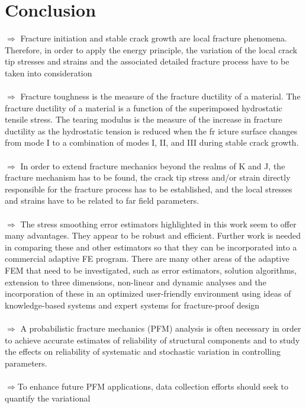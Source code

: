\documentclass[12pt]{article}
\begin{document}
\section{Conclusion}
$\Rightarrow$ Fracture initiation and stable crack growth are local fracture phenomena. Therefore, in order to
apply the energy principle, the variation of the local crack tip stresses and strains and the associated
detailed fracture process have to be taken into consideration
\\\\$\Rightarrow$ Fracture toughness is the measure of the fracture ductility of a material. The fracture ductility of
a material is a function of the superimposed hydrostatic tensile stress. The tearing modulus is the
measure of the increase in fracture ductility as the hydrostatic tension is reduced when the fr icture
surface changes from mode I to a combination of modes I, II, and III during stable crack growth.
\\\\$\Rightarrow$ In order to extend fracture mechanics beyond the realms of K and J, the fracture mechanism has
to be found, the crack tip stress and/or strain directly responsible for the fracture process has to be
established, and the local stresses and strains have to be related to far field parameters.
\\\\$\Rightarrow$ The stress smoothing error estimators highlighted in this work seem to offer many advantages.
They appear to be robust and efficient. Further work is needed in comparing these and other
estimators so that they can be incorporated into a commercial adaptive FE program.
There are many other areas of the adaptive FEM that need to be investigated, such as error
estimators, solution algorithms, extension to three dimensions, non-linear and dynamic analyses
and the incorporation of these in an optimized user-friendly environment using ideas of
knowledge-based systems and expert systems for fracture-proof design
\\\\$\Rightarrow$ A probabilistic fracture mechanics (PFM) analysis is often necessary in order to achieve accurate
estimates of reliability of structural components and
to study the effects on reliability of systematic and
stochastic variation in controlling parameters.
\\\\$\Rightarrow$To enhance future PFM applications, data collection efforts should seek to quantify the variational
\end{document}
